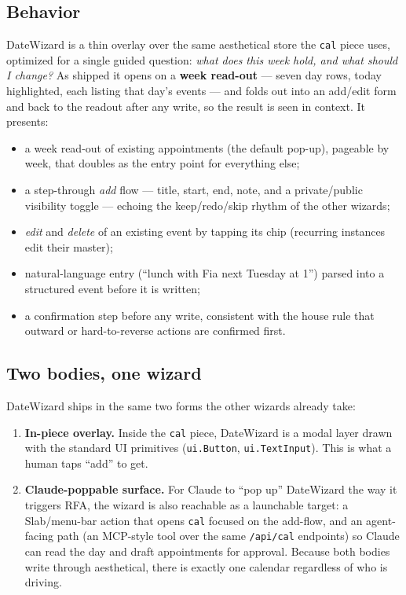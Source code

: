 \documentclass[10pt,letterpaper,twocolumn]{article}
\begin{document}
\subsection{Behavior}

DateWizard is a thin overlay over the same aesthetical store the \texttt{cal} piece uses, optimized for a single guided question: \emph{what does this week hold, and what should I change?} As shipped it opens on a \textbf{week read-out} --- seven day rows, today highlighted, each listing that day's events --- and folds out into an add/edit form and back to the readout after any write, so the result is seen in context. It presents:

\begin{itemize}
  \item a week read-out of existing appointments (the default pop-up), pageable by week, that doubles as the entry point for everything else;
  \item a step-through \emph{add} flow --- title, start, end, note, and a private/public visibility toggle --- echoing the keep/redo/skip rhythm of the other wizards;
  \item \emph{edit} and \emph{delete} of an existing event by tapping its chip (recurring instances edit their master);
  \item natural-language entry (``lunch with Fia next Tuesday at 1'') parsed into a structured event before it is written;
  \item a confirmation step before any write, consistent with the house rule that outward or hard-to-reverse actions are confirmed first.
\end{itemize}

\subsection{Two bodies, one wizard}

DateWizard ships in the same two forms the other wizards already take:

\begin{enumerate}
  \item \textbf{In-piece overlay.} Inside the \texttt{cal} piece, DateWizard is a modal layer drawn with the standard UI primitives (\texttt{ui.Button}, \texttt{ui.TextInput}). This is what a human taps ``add'' to get.
  \item \textbf{Claude-poppable surface.} For Claude to ``pop up'' DateWizard the way it triggers RFA, the wizard is also reachable as a launchable target: a Slab/menu-bar action that opens \texttt{cal} focused on the add-flow, and an agent-facing path (an MCP-style tool over the same \texttt{/api/cal} endpoints) so Claude can read the day and draft appointments for approval. Because both bodies write through aesthetical, there is exactly one calendar regardless of who is driving.
\end{enumerate}
\end{document}
